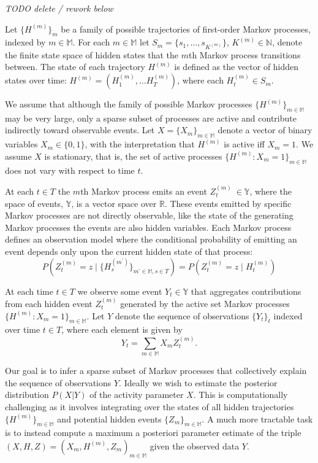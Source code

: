 \documentclass[twoside, 11pt]{article}
\newcommand{\mm}[0] {\mathbb{M}} %
\newcommand{\traj}[1] {H^{(#1)}}
\newcommand{\state}[2] {H_{#2}^{(#1)}}
\newcommand{\event}[2] {Z_{#2}^{(#1)}}
\newcommand{\reals}[0] {\mathbb{R}}
\newcommand{\naturals}[0] {\mathbb{N}}
\newcommand{\events}[0] {\mathbb{Y}}
\begin{document}
\emph{TODO delete / rework below}

Let $\{ \traj m \}_m$ be a family of possible trajectories of first-order Markov processes, indexed by $m \in \mm$. For each $m \in \mm$ let $S_m = \{s_1, \ldots, s_{K^{(m)}}\}$, $K^{(m)} \in \naturals$, denote the finite state space of hidden states that the $m$th Markov process transitions between. The state of each trajectory $\traj m$ is defined as the vector of hidden states over time: $\traj m = (\state m 1, \ldots \state m T)$, where each $\state m t \in S_m$.

We assume that although the family of possible Markov processes $\{\traj m\}_{m \in \mm}$ may be very large, only a sparse subset of processes are active and contribute indirectly toward observable events. Let $X = \{X_m\}_{m \in \mm}$ denote a vector of binary variables $X_m \in \{0, 1\}$, with the interpretation that $\traj m$ is active iff $X_m = 1$. We assume $X$ is stationary, that is, the set of active processes $\{ \traj m : X_m = 1\}_{m \in \mm}$ does not vary with respect to time $t$.

At each $t \in T$ the $m$th Markov process emits an event $\event m t \ \in \events$, where the space of events, $\events$, is a vector space over $\reals$. These events emitted by specific Markov processes are not directly observable, like the state of the generating Markov processes the events are also hidden variables. Each Markov process defines an observation model where the conditional probability of emitting an event depends only upon the current hidden state of that process:
\begin{equation}
P\left(\event m t = z \mid \{\state {m^\prime} s\}_{m^\prime \in \mm, s \in T} \right) =
P\left(\event m t = z \mid \state m t \right) \label{obsmodelindep}
\end{equation}

At each time $t \in T$ we observe some event $Y_t \in \events$ that aggregates contributions from each hidden event $\event m t$ generated by the active set Markov processes $\{ \traj m : X_m = 1\}_{m \in \mm}$. Let $Y$ denote the sequence of observations $\{Y_t\}_t$ indexed over time $t \in T$, where each element is given by
\begin{equation}
Y_t = \sum_{m \in \mm} X_m \event m t .
\end{equation}

Our goal is to infer a sparse subset of Markov processes that collectively explain the sequence of observations $Y$. Ideally we wish to estimate the posterior distribution $P(X | Y)$ of the activity parameter $X$. This is computationally challenging as it involves integrating over the states of all hidden trajectories $\{ \traj m\}_{m \in \mm}$ and potential hidden events $\{ Z_m \}_{m \in \mm}$. A much more tractable task is to instead compute a maximum a posteriori parameter estimate of the triple $(X, H, Z) = (X_m, \traj m, Z_m)_{m \in \mm}$ given the observed data $Y$.
\end{document}
